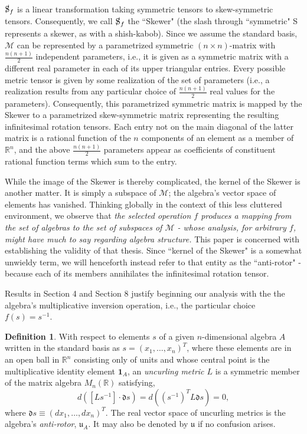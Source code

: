 \documentclass{amsart}
\numberwithin{equation}{section}
\theoremstyle{definition}
\newtheorem{definition}[theorem]{Definition}
\numberwithin{theorem}{section}
\begin{document}
$\slashed{\text{S}}_f$ is a linear transformation taking symmetric tensors to skew-symmetric tensors. Consequently, we call $\slashed{\text{S}}_f$ the ``Skewer" (the slash through ``symmetric" S represents a skewer, as with a shish-kabob). Since we assume the standard basis, $\mathcal{M}$ can be represented by a parametrized symmetric $(n\times n)$-matrix with $\frac{n(n+1)}{2}$ independent parameters, i.e., it is given as a symmetric matrix with a different real parameter in each of its upper triangular entries.  Every possible metric tensor is given by some realization of the set of parameters (i.e., a realization results from any particular choice of $\frac{n(n+1)}{2}$ real values for the parameters).  Consequently, this parametrized symmetric matrix is mapped by the Skewer to a parametrized skew-symmetric matrix representing the resulting infinitesimal rotation tensors.  Each entry not on the main diagonal of the latter matrix is a rational function of the $n$ components of an element as a member of $\mathbb{R}^n$, and the above $\frac{n(n+1)}{2}$ parameters appear as coefficients of constituent rational function terms which sum to the entry.  

While the image of the Skewer is thereby complicated, the kernel of the Skewer is another matter.  It is simply a subspace of $\mathcal{M}$;  the algebra's vector space of elements has vanished.  Thinking globally in the context of this less cluttered environment, we observe that
{\it the selected operation $f$ produces a mapping from the set of algebras to the set of subspaces of $\mathcal{M}$ - whose analysis, for arbitrary $f$, might have much to say regarding algebra structure.}
This paper is concerned with establishing the validity of that thesis. 
  Since ``kernel of the Skewer" is a somewhat unwieldy term, we will henceforth instead refer to that entity as the ``anti-rotor" - because each of its members annihilates the infinitesimal rotation tensor.
  
Results in Section 4 and Section 8 justify beginning our analysis with the the algebra's multiplicative inversion operation, i.e., the particular choice $f(s)=s^{-1}$.  

     \begin{definition}\label{7/21/23.1} With respect to elements $s$ of a given $n$-dimensional algebra $A$ written in the standard basis as $s= (x_1,\dots,x_n)^T$, where these elements are in an open ball in $\mathbb{R}^n$ consisting only of units and whose central point is the multiplicative identity element $\mathbf{1}_A$, an {\it uncurling metric $L$} is a symmetric member of the matrix algebra $M_n(\mathbb{R})$  satisfying, \begin{equation}\label{4/7/23.1} d\left([Ls^{-1}]\cdot \mathfrak{d}s\right) = d\left((s^{-1})^T L \mathfrak{d}s\right) = 0, \end{equation} where $\mathfrak{d}s \equiv (dx_1,\dots,dx_n)^T$.  The real vector space of uncurling metrics is the algebra's {\it anti-rotor}, $\mathfrak{u}_A$.  It may also be denoted by $\mathfrak{u}$ if no confusion arises.    \end{definition}
     
\end{document}
